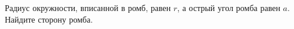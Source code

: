 \begin{ex}
	\begin{condition}
		Радиус окружности, вписанной в ромб, равен \( r \), а острый угол ромба равен \( a \). Найдите сторону ромба.
	\end{condition}
\end{ex}
